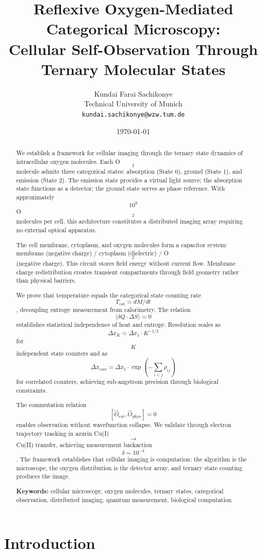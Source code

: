 \documentclass[twocolumn,10pt]{article}
\title{Reflexive Oxygen-Mediated Categorical Microscopy:\\
\large Cellular Self-Observation Through Ternary Molecular States}
\author{
Kundai Farai Sachikonye\\
Technical University of Munich\\
\texttt{kundai.sachikonye@wzw.tum.de}
}
\date{\today}
\begin{document}
\maketitle

\begin{abstract}
We establish a framework for cellular imaging through the ternary state dynamics of intracellular oxygen molecules. Each O$$_2$$ molecule admits three categorical states: absorption (State 0), ground (State 1), and emission (State 2). The emission state provides a virtual light source; the absorption state functions as a detector; the ground state serves as phase reference. With approximately $$10^9$$ O$$_2$$ molecules per cell, this architecture constitutes a distributed imaging array requiring no external optical apparatus.

The cell membrane, cytoplasm, and oxygen molecules form a capacitor system: membrane (negative charge) / cytoplasm (dielectric) / O$$_2$$ (negative charge). This circuit stores field energy without current flow. Membrane charge redistribution creates transient compartments through field geometry rather than physical barriers.

We prove that temperature equals the categorical state counting rate $$T_{\text{cat}} = dM/dt$$, decoupling entropy measurement from calorimetry. The relation $$\langle \delta Q \cdot \Delta S \rangle = 0$$ establishes statistical independence of heat and entropy. Resolution scales as $$\Delta x_K = \Delta x_1 \cdot K^{-1/2}$$ for $$K$$ independent state counters and as $$\Delta x_{\text{corr}} = \Delta x_1 \cdot \exp\left(-\sum_{i<j} \rho_{ij}\right)$$ for correlated counters, achieving sub-angstrom precision through biological constraints.

The commutation relation $$[\hat{O}_{\text{cat}}, \hat{O}_{\text{phys}}] = 0$$ enables observation without wavefunction collapse. We validate through electron trajectory tracking in azurin Cu(I) $$\rightarrow$$ Cu(II) transfer, achieving measurement backaction $$\delta \sim 10^{-4}$$. The framework establishes that cellular imaging is computation: the algorithm is the microscope, the oxygen distribution is the detector array, and ternary state counting produces the image.

\textbf{Keywords:} cellular microscopy, oxygen molecules, ternary states, categorical observation, distributed imaging, quantum measurement, biological computation
\end{abstract}


\section{Introduction}
\end{document}
